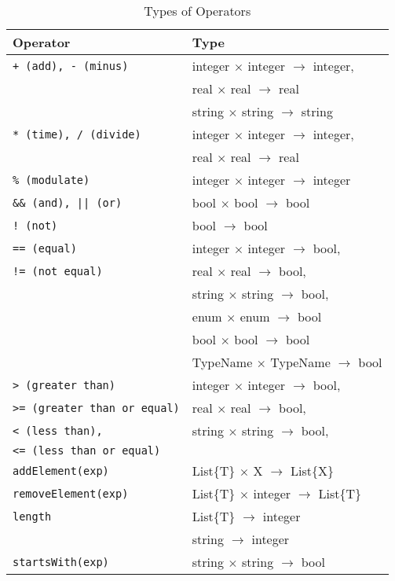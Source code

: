 \documentclass[english]{report}
\begin{document}
\begin{table}[htp]
\caption{Types of Operators}\label{tbl:Tab4}
\begin{center}
\begin{tabular}{|l|l|}
\hline\hline
\textbf{Operator} & \textbf{Type}\\
\hline \hline
\texttt{+ (add), - (minus)} &integer $\times$ integer $\rightarrow$ integer, \\
&real $\times$ real $\rightarrow$ real\\
&string $\times$ string $\rightarrow$ string\\
\hline
\texttt{* (time), / (divide)} &integer $\times$ integer $\rightarrow$ integer, \\
&real $\times$ real $\rightarrow$ real\\
\hline
\texttt{\% (modulate) } &integer $\times$ integer $\rightarrow$ integer\\
\hline
\texttt{\&\& (and), || (or)} & bool $\times$ bool $\rightarrow$ bool\\
\hline
\texttt{! (not)} & bool $\rightarrow$ bool\\
\hline
\texttt{== (equal)} &integer $\times$ integer $\rightarrow$ bool, \\
\texttt{!= (not equal)} & real $\times$ real $\rightarrow$ bool, \\ 
& string $\times$ string $\rightarrow$ bool, \\
& enum $\times$ enum $\rightarrow$ bool \\
& bool $\times$ bool $\rightarrow$ bool\\
& TypeName $\times$ TypeName $\rightarrow$ bool\\
\hline
\texttt{>   (greater than)} &integer $\times$ integer $\rightarrow$ bool, \\
\texttt{>= (greater than or equal)}& real $\times$ real $\rightarrow$ bool, \\
\texttt{<   (less than),} & string $\times$ string $\rightarrow$ bool, \\
\texttt{<= (less than or equal)}  & \\
\hline
\texttt{addElement(exp)} & List\{T\} $\times$ X $\rightarrow$ List\{X\}\\
\hline
\texttt{removeElement(exp)} & List\{T\} $\times$ integer $\rightarrow$ List\{T\}\\
\hline
\texttt{length} & List\{T\} $\rightarrow$ integer\\
& string $\rightarrow$ integer\\
\hline
\texttt{startsWith(exp)} & string $\times$ string $\rightarrow$ bool\\

\end{tabular}
\end{center}
\end{table}
\end{document}
